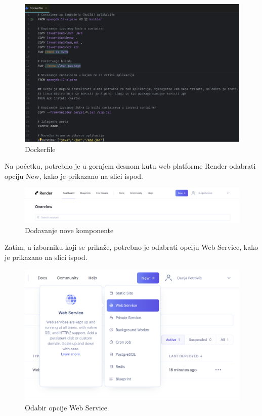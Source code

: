 		\begin{figure}[H]
			\includegraphics[scale=0.4]{slike/Dockerfile.PNG} %
			\centering
			\caption{Dockerfile}
			\label{Dockerfile}
		\end{figure}
		
		
Na početku, potrebno je u gornjem desnom kutu web platforme Render odabrati opciju New, kako je prikazano na slici ispod.
		
			\begin{figure}[H]
			\includegraphics[scale=0.4]{slike/Render_NEW.PNG} %
			\centering
			\caption{Dodavanje nove komponente}
			\label{Dodavanje nove komponente}
		\end{figure}
		
		Zatim, u izborniku koji se prikaže, potrebno je odabrati opciju Web Service, kako je prikazano na slici ispod.
					\begin{figure}[H]
			\includegraphics[scale=0.4]{slike/Render_WEB_SERVICE.PNG} %
			\centering
			\caption{Odabir opcije Web Service}
			\label{Odabir opcije Web Service}
		\end{figure}
		
